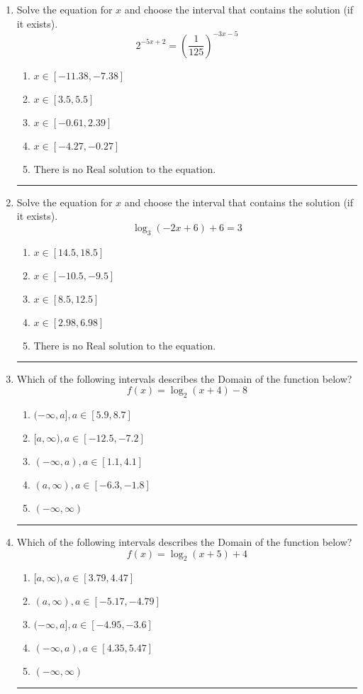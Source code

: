 \documentclass[14pt]{extbook}
\newcommand{\litem}[1]{\item#1\hspace*{-1cm}\rule{\textwidth}{0.4pt}}
\begin{document}
\begin{enumerate}
\litem{
Solve the equation for $x$ and choose the interval that contains the solution (if it exists).\[ 2^{-5x+2} = \left(\frac{1}{125}\right)^{-3x-5} \]\begin{enumerate}[label=\Alph*.]
\item \( x \in [-11.38, -7.38] \)
\item \( x \in [3.5, 5.5] \)
\item \( x \in [-0.61, 2.39] \)
\item \( x \in [-4.27, -0.27] \)
\item \( \text{There is no Real solution to the equation.} \)

\end{enumerate} }
\litem{
Solve the equation for $x$ and choose the interval that contains the solution (if it exists).\[ \log_{3}{(-2x+6)}+6 = 3 \]\begin{enumerate}[label=\Alph*.]
\item \( x \in [14.5, 18.5] \)
\item \( x \in [-10.5, -9.5] \)
\item \( x \in [8.5, 12.5] \)
\item \( x \in [2.98, 6.98] \)
\item \( \text{There is no Real solution to the equation.} \)

\end{enumerate} }
\litem{
Which of the following intervals describes the Domain of the function below?\[ f(x) = \log_2{(x+4)}-8 \]\begin{enumerate}[label=\Alph*.]
\item \( (-\infty, a], a \in [5.9, 8.7] \)
\item \( [a, \infty), a \in [-12.5, -7.2] \)
\item \( (-\infty, a), a \in [1.1, 4.1] \)
\item \( (a, \infty), a \in [-6.3, -1.8] \)
\item \( (-\infty, \infty) \)

\end{enumerate} }
\litem{
Which of the following intervals describes the Domain of the function below?\[ f(x) = \log_2{(x+5)}+4 \]\begin{enumerate}[label=\Alph*.]
\item \( [a, \infty), a \in [3.79, 4.47] \)
\item \( (a, \infty), a \in [-5.17, -4.79] \)
\item \( (-\infty, a], a \in [-4.95, -3.6] \)
\item \( (-\infty, a), a \in [4.35, 5.47] \)
\item \( (-\infty, \infty) \)


\end{enumerate}}
\end{enumerate}
\end{document}
